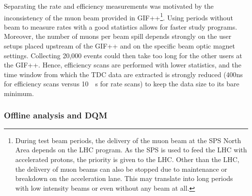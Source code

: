 	Separating the rate and efficiency measurements was motivated by the inconsistency of the muon beam provided in GIF++\footnote{During test beam periods, the delivery of the muon beam at the SPS North Area depends on the LHC program. As the SPS is used to feed the LHC with accelerated protons, the priority is given to the LHC. Other than the LHC, the delivery of muon beams can also be stopped due to maintenance or breakdown on the acceleration lane. This may translate into long periods with low intensity beams or even without any beam at all.}. Using periods without beam to measure rates with a good statistics allows for faster study programs. Moreover, the number of muons per beam spill depends strongly on the user setups placed upstream of the GIF++ and on the specific beam  optic magnet settings. Collecting 20,000 events could then take too long for the other users at the GIF++. Hence, efficiency scans are performed with lower statistics, and the time window from which the TDC data are extracted is strongly reduced (\si{400}{ns} for efficiency scans versus \SI{10}{\mu s} for rate scans) to keep the data size to its bare minimum.
	
		\subsubsection{Offline analysis and \acl{DQM}}
		\label{chapt5:sssec:DQM}

